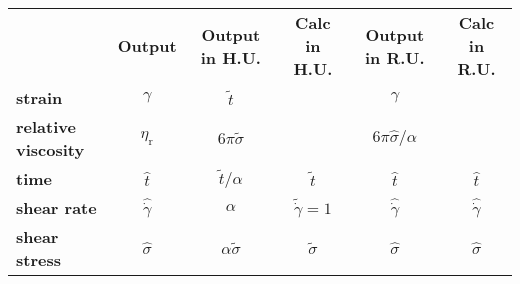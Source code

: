 \documentclass[fontsize=11pt]{scrartcl}
\begin{document}
\begin{center}
  \begin{tabular}{lccccc}
    &   {\bf Output} & {\bf Output in H.U.} &  {\bf Calc in H.U.}
    & {\bf Output in R.U.} &  {\bf Calc in R.U.}
    \\
    {\bf strain} & $\gamma $ & $ \tilde{t}$
    & & $\gamma $
    \\
    {\bf relative viscosity}   &  $ \eta_{\mathrm{r}}$ &
    $6 \pi \tilde{\sigma}$ &  &
    $6 \pi \hat{\sigma}/\alpha$  & \\
    {\bf time}  & $\hat{t}$ & $ \tilde{t}/\alpha$
    &  $\tilde{t} $ & $\hat{t}$ & $\hat{t}$\\
    {\bf shear rate}& $\hat{\dot{\gamma}}$ & $\alpha$ & $\tilde{\dot{\gamma}} = 1$
    & $\hat{\dot{\gamma}}$ & $\hat{\dot{\gamma}}$  \\
    {\bf shear stress} & $\hat{\sigma}$
       & $\alpha\tilde{\sigma}$  & $\tilde{\sigma} $  &
      $\hat{\sigma}$ &  $\hat{\sigma}$ 
  \end{tabular} 
\end{center}
\end{document}
